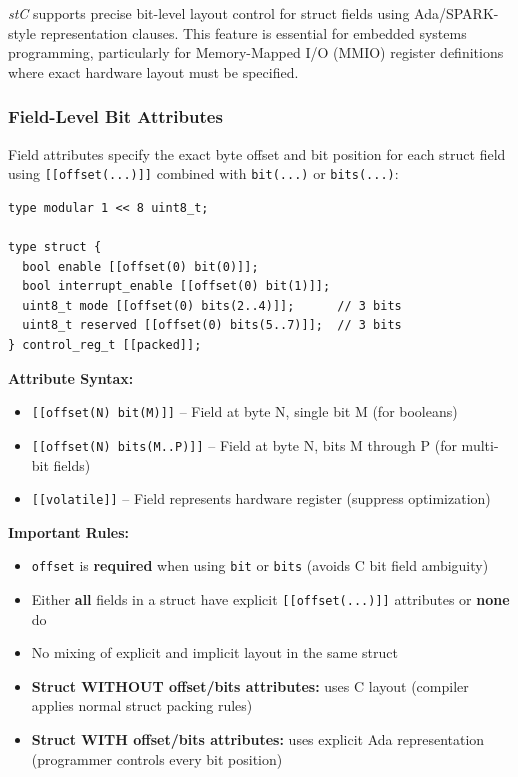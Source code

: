 \documentclass[11pt,letterpaper,twoside,openany]{book}
\begin{document}
\emph{stC} supports precise bit-level layout control for struct fields using Ada/SPARK-style representation clauses. This feature is essential for embedded systems programming, particularly for Memory-Mapped I/O (MMIO) register definitions where exact hardware layout must be specified.

\subsubsection{Field-Level Bit Attributes}

Field attributes specify the exact byte offset and bit position for each struct field using \verb'[[offset(...)]]' combined with \verb'bit(...)' or \verb'bits(...)':

\begin{lstlisting}
type modular 1 << 8 uint8_t;

type struct {
  bool enable [[offset(0) bit(0)]];
  bool interrupt_enable [[offset(0) bit(1)]];
  uint8_t mode [[offset(0) bits(2..4)]];      // 3 bits
  uint8_t reserved [[offset(0) bits(5..7)]];  // 3 bits
} control_reg_t [[packed]];
\end{lstlisting}

\textbf{Attribute Syntax:}
\begin{itemize}
\item \verb'[[offset(N) bit(M)]]' -- Field at byte N, single bit M (for booleans)
\item \verb'[[offset(N) bits(M..P)]]' -- Field at byte N, bits M through P (for multi-bit fields)
\item \verb'[[volatile]]' -- Field represents hardware register (suppress optimization)
\end{itemize}

\textbf{Important Rules:}
\begin{itemize}
\item \verb'offset' is \textbf{required} when using \verb'bit' or \verb'bits' (avoids C bit field ambiguity)
\item Either \textbf{all} fields in a struct have explicit \verb'[[offset(...)]]' attributes or \textbf{none} do
\item No mixing of explicit and implicit layout in the same struct
\item \textbf{Struct WITHOUT offset/bits attributes:} uses C layout (compiler applies normal struct packing rules)
\item \textbf{Struct WITH offset/bits attributes:} uses explicit Ada representation (programmer controls every bit position)
\end{itemize}
\end{document}
